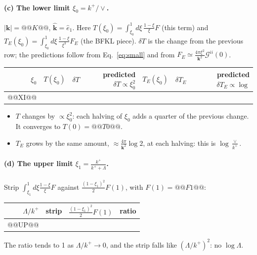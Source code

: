 \documentclass[10pt]{article}
\numberwithin{equation}{section}
\newcommand{\GG}{\mathcal G}
\begin{document}
\paragraph{(c) The lower limit $\xi_0=k^+/\vee$.} $|\mathbf k|=@@K@@$, $\hat{\mathbf k}=\hat e_1$. Here $T(\xi_0)=\int_{\xi_0}^1d\xi\,\frac{1-\xi}{\xi}F$ (this term) and $T_E(\xi_0)=\int_{\xi_0}^1d\xi\,\frac{1-\xi}{\xi^3}F_E$ (the BFKL piece). $\delta T$ is the change from the previous row; the predictions follow from Eq.~\eqref{eq:small} and from $F_E\simeq\frac{4\pi\xi^2}{\mathbf k^2}\GG^{ii}(0)$.
\begin{center}\small
\begin{tabular}{@{}rrrr|rrr@{}}\toprule
$\xi_0$ & $T(\xi_0)$ & $\delta T$ & predicted $\delta T\propto\xi_0^2$ & $T_E(\xi_0)$ & $\delta T_E$ & predicted $\delta T_E\propto\log$\\\midrule
@@XI@@
\bottomrule
\end{tabular}
\end{center}
\begin{itemize}
\item $T$ changes by $\propto\xi_0^2$: each halving of $\xi_0$ adds a quarter of the previous change. It converges to $T(0)=@@T0@@$.
\item $T_E$ grows by the same amount, $\approx\frac{4\pi}{\mathbf k^2}\log2$, at each halving: this is $\log\frac{\vee}{k^+}$.
\end{itemize}

\paragraph{(d) The upper limit $\xi_1=\frac{k^+}{k^++\Lambda}$.} Strip $\int_{\xi_1}^1d\xi\frac{1-\xi}{\xi}F$ against $\frac{(1-\xi_1)^2}{2}F(1)$, with $F(1)=@@F1@@$:
\begin{center}\small
\begin{tabular}{@{}rrrr@{}}\toprule
$\Lambda/k^+$ & strip & $\frac{(1-\xi_1)^2}{2}F(1)$ & ratio\\\midrule
@@UP@@
\bottomrule
\end{tabular}
\end{center}
The ratio tends to 1 as $\Lambda/k^+\to0$, and the strip falls like $(\Lambda/k^+)^2$: no $\log\Lambda$.
\end{document}
